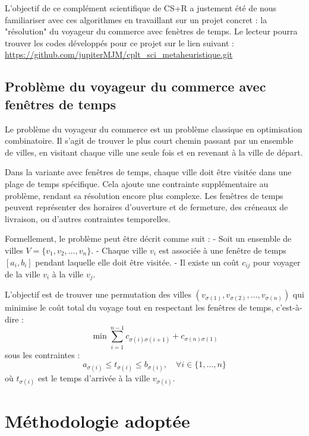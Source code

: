 \documentclass[a4paper, 12pt]{article}
\begin{document}
L'objectif de ce complément scientifique de CS+R a justement été de nous familiariser avec ces algorithmes en travaillant sur un projet concret : la "résolution" du voyageur du commerce avec fenètres de temps.
Le lecteur pourra trouver les codes développés pour ce projet sur le lien suivant : \url{https://github.com/jupiterMJM/cplt_sci_metaheuristique.git}

\subsection{Problème du voyageur du commerce avec fenêtres de temps}
Le problème du voyageur du commerce est un problème classique en optimisation combinatoire. Il s'agit de trouver le plus court chemin passant par un ensemble de villes, en visitant chaque ville une seule fois et en revenant à la ville de départ. 

Dans la variante avec fenêtres de temps, chaque ville doit être visitée dans une plage de temps spécifique. Cela ajoute une contrainte supplémentaire au problème, rendant sa résolution encore plus complexe. Les fenêtres de temps peuvent représenter des horaires d'ouverture et de fermeture, des créneaux de livraison, ou d'autres contraintes temporelles.

Formellement, le problème peut être décrit comme suit :
- Soit un ensemble de villes $V = \{v_1, v_2, \ldots, v_n\}$.
- Chaque ville $v_i$ est associée à une fenêtre de temps $[a_i, b_i]$ pendant laquelle elle doit être visitée.
- Il existe un coût $c_{ij}$ pour voyager de la ville $v_i$ à la ville $v_j$.

L'objectif est de trouver une permutation des villes $(v_{\sigma(1)}, v_{\sigma(2)}, \ldots, v_{\sigma(n)})$ qui minimise le coût total du voyage tout en respectant les fenêtres de temps, c'est-à-dire :
\[
\min \sum_{i=1}^{n-1} c_{\sigma(i)\sigma(i+1)} + c_{\sigma(n)\sigma(1)}
\]
sous les contraintes :
\[
a_{\sigma(i)} \leq t_{\sigma(i)} \leq b_{\sigma(i)}, \quad \forall i \in \{1, \ldots, n\}
\]
où $t_{\sigma(i)}$ est le temps d'arrivée à la ville $v_{\sigma(i)}$.


\section{Méthodologie adoptée}
\end{document}
